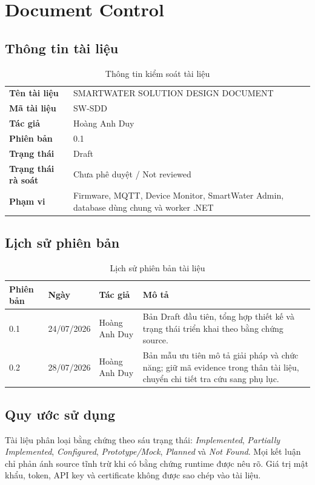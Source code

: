 \chapter*{Document Control}

\section*{Thông tin tài liệu}
\begin{table}[H]
\centering
\begin{tabularx}{\textwidth}{>{\bfseries}p{}X}
\toprule
Tên tài liệu & SMARTWATER SOLUTION DESIGN DOCUMENT \\
Mã tài liệu & SW-SDD \\
Tác giả & Hoàng Anh Duy \\
Phiên bản & 0.1 \\
Trạng thái & Draft \\
Trạng thái rà soát & Chưa phê duyệt / Not reviewed \\
Phạm vi & Firmware, MQTT, Device Monitor, SmartWater Admin, database dùng chung và worker .NET \\
\bottomrule
\end{tabularx}
\caption{Thông tin kiểm soát tài liệu}
\end{table}

\section*{Lịch sử phiên bản}
\begin{table}[H]
\centering
\begin{tabularx}{\textwidth}{p{}p{}p{}X}
\toprule
\textbf{Phiên bản} & \textbf{Ngày} & \textbf{Tác giả} & \textbf{Mô tả} \\
\midrule
0.1 & 24/07/2026 & Hoàng Anh Duy & Bản Draft đầu tiên, tổng hợp thiết kế và trạng thái triển khai theo bằng chứng source. \\
0.2 & 28/07/2026 & Hoàng Anh Duy & Bản mẫu ưu tiên mô tả giải pháp và chức năng; giữ mã evidence trong thân tài liệu, chuyển chi tiết tra cứu sang phụ lục. \\
\bottomrule
\end{tabularx}
\caption{Lịch sử phiên bản tài liệu}
\end{table}

\section*{Quy ước sử dụng}
Tài liệu phân loại bằng chứng theo sáu trạng thái: \textit{Implemented},
\textit{Partially Implemented}, \textit{Configured}, \textit{Prototype/Mock},
\textit{Planned} và \textit{Not Found}. Mọi kết luận chỉ phản ánh source tĩnh trừ khi
có bằng chứng runtime được nêu rõ. Giá trị mật khẩu, token, API key và certificate
không được sao chép vào tài liệu.

\clearpage
